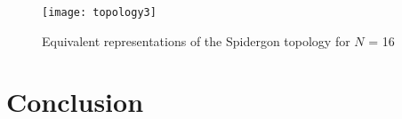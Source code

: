 	\begin{figure}[ht]
	\centering
		\texttt{[image: topology3]}
		\caption{Equivalent representations of the Spidergon topology for ${N}$ = 16}
		\label{fig: topology}
	\end{figure}

\section{Conclusion}\label{S:conclusion}






